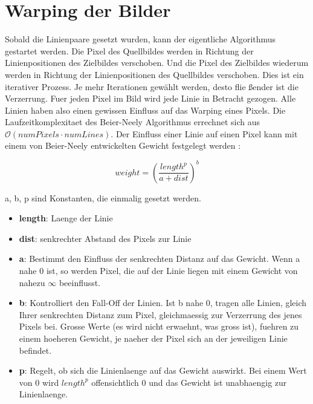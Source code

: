 \chapter{Warping der Bilder}

Sobald die Linienpaare gesetzt wurden, kann der eigentliche Algorithmus gestartet werden. Die Pixel
des Quellbildes werden in Richtung der Linienpositionen des Zielbildes verschoben. Und die Pixel
des Zielbildes wiederum werden in Richtung der Linienpositionen des Quellbildes verschoben.
Dies ist ein iterativer Prozess. Je mehr Iterationen gewählt werden, desto flie \ss ender ist
die Verzerrung.
Fuer jeden Pixel im Bild wird jede Linie in Betracht gezogen. Alle Linien haben also einen gewissen Einfluss auf
das Warping eines Pixels. Die Laufzeitkomplexitaet
des Beier-Neely Algorithmus errechnet sich aus
$\mathcal{O}(numPixels \cdot numLines)$.
Der Einfluss einer Linie auf einen Pixel kann mit einem
von Beier-Neely entwickelten Gewicht festgelegt werden
\cite{beierneely}:

\begin{equation}
	weight = \left(\frac{length^{p}}{a+dist}\right)^{b}
\end{equation}

a, b, p sind Konstanten, die einmalig gesetzt werden.

\begin{itemize}
	\item \textbf{length}: Laenge der Linie
	\item \textbf{dist}: senkrechter Abstand des Pixels zur Linie
	\item \textbf{a}: Bestimmt den Einfluss der senkrechten Distanz
	auf das Gewicht. Wenn a nahe 0 ist, so werden Pixel, die auf der
	Linie liegen mit einem Gewicht von nahezu $\infty$ beeinflusst.
	\item \textbf{b}: Kontrolliert den Fall-Off der Linien. Ist b
	nahe 0, tragen alle Linien, gleich Ihrer senkrechten Distanz zum
	Pixel, gleichmaessig zur Verzerrung des jenes Pixels bei.
	Grosse Werte (es wird nicht erwaehnt, was gross ist), fuehren
	zu einem hoeheren Gewicht, je naeher der Pixel sich an
	der jeweiligen Linie befindet.
	\item \textbf{p}: Regelt, ob sich die Linienlaenge auf das Gewicht
	auswirkt. Bei einem Wert von 0 wird $length^{p}$ offensichtlich 0
	und das Gewicht ist unabhaengig zur Linienlaenge.
\end{itemize}

